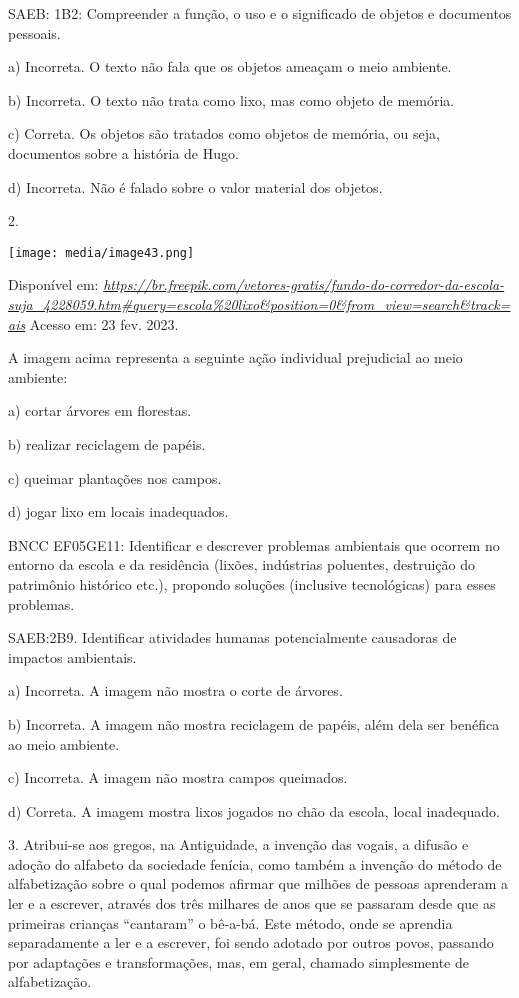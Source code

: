 SAEB: 1B2: Compreender a função, o uso e o significado de objetos e
documentos pessoais.

a) Incorreta. O texto não fala que os objetos ameaçam o meio ambiente.

b) Incorreta. O texto não trata como lixo, mas como objeto de memória.

c) Correta. Os objetos são tratados como objetos de memória, ou seja,
documentos sobre a história de Hugo.

d) Incorreta. Não é falado sobre o valor material dos objetos.

2.

\texttt{[image: media/image43.png]}

Disponível em:
\href{https://br.freepik.com/vetores-gratis/fundo-do-corredor-da-escola-suja_4228059.htm\#query=escola\%20lixo\&position=0\&from_view=search\&track=ais}{\emph{https://br.freepik.com/vetores-gratis/fundo-do-corredor-da-escola-suja\_4228059.htm\#query=escola\%20lixo\&position=0\&from\_view=search\&track=ais}}
Acesso em: 23 fev. 2023.

A imagem acima representa a seguinte ação individual prejudicial ao meio
ambiente:

a) cortar árvores em florestas.

b) realizar reciclagem de papéis.

c) queimar plantações nos campos.

d) jogar lixo em locais inadequados.

BNCC EF05GE11: Identificar e descrever problemas ambientais que ocorrem
no entorno da escola e da residência (lixões, indústrias poluentes,
destruição do patrimônio histórico etc.), propondo soluções (inclusive
tecnológicas) para esses problemas.

SAEB:2B9. Identificar atividades humanas potencialmente causadoras de
impactos ambientais.

a) Incorreta. A imagem não mostra o corte de árvores.

b) Incorreta. A imagem não mostra reciclagem de papéis, além dela ser
benéfica ao meio ambiente.

c) Incorreta. A imagem não mostra campos queimados.

d) Correta. A imagem mostra lixos jogados no chão da escola, local
inadequado.

3. Atribui-se aos gregos, na Antiguidade, a invenção das vogais, a
difusão e adoção do alfabeto da sociedade fenícia, como também a
invenção do método de alfabetização sobre o qual podemos afirmar que
milhões de pessoas aprenderam a ler e a escrever, através dos três
milhares de anos que se passaram desde que as primeiras crianças
``cantaram'' o bê-a-bá. Este método, onde se aprendia separadamente a
ler e a escrever, foi sendo adotado por outros povos, passando por
adaptações e transformações, mas, em geral, chamado simplesmente de
alfabetização.

